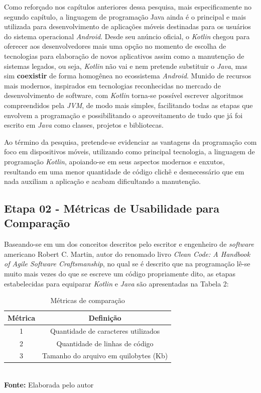 Como reforçado nos capítulos anteriores dessa pesquisa, mais especificamente no segundo capítulo, a linguagem de programação Java ainda é o principal e mais utilizada para desenvolvimento de aplicações móveis destinadas para os usuários do sistema operacional \textit{Android}. Desde seu anúncio oficial, o \textit{Kotlin} chegou para oferecer aos desenvolvedores mais uma opção no momento de escolha de tecnologias para elaboração de novos aplicativos assim como a manutenção de sistemas legados, ou seja, \textit{Kotlin} não vai e nem pretende substituir o \textit{Java}, mas sim \textbf{coexistir} de forma homogênea no ecossistema \textit{Android}. Munido de recursos mais modernos, inspirados em tecnologias reconhecidas no mercado de desenvolvimento de software, com \textit{Kotlin} torna-se possível escrever algoritmos compreendidos pela \textit{JVM}, de modo mais simples, facilitando todas as etapas que envolvem a programação e possibilitando o aproveitamento de tudo que já foi escrito em \textit{Java} como classes, projetos e bibliotecas.

Ao término da pesquisa, pretende-se evidenciar as vantagens da programação com foco em dispositivos móveis, utilizando como principal tecnologia, a linguagem de programação \textit{Kotlin}, apoiando-se em seus aspectos modernos e enxutos, resultando em uma menor quantidade de código clichê e desnecessário que em nada auxiliam a aplicação e acabam dificultando a manutenção.

\subsection{Etapa 02 - Métricas de Usabilidade para Comparação} 
Baseando-se em um dos conceitos descritos pelo escritor e engenheiro de \textit{software} americano Robert C. Martin, autor do renomado livro \textit{Clean Code: A Handbook of Agile Software Craftsmanship}, no qual se é descrito que na programação lê-se muito mais vezes do que se escreve um código propriamente dito, as etapas estabelecidas para equiparar \textit{Kotlin} e \textit{Java} são apresentadas na Tabela 2:

\FloatBarrier
\begin{table}[!htbp]
\centering
\caption{Métricas de comparação}
	\begin{tabular}{ c | c }
		\hline
		\textbf{Métrica} & \textbf{Definição}                  \\ \hline
		
		             1 	 & Quantidade de caracteres utilizados	\\ \hline
		             
		             2   & Quantidade de linhas de código        \\ \hline
		             
		         	 3   & Tamanho do arquivo em quilobytes (Kb) \\ \hline
	\end{tabular}
	\\ \vspace{0.2cm}
	\textbf{Fonte:} Elaborada pelo autor
	\label{tab:exemplo}
\end{table}
\FloatBarrier

